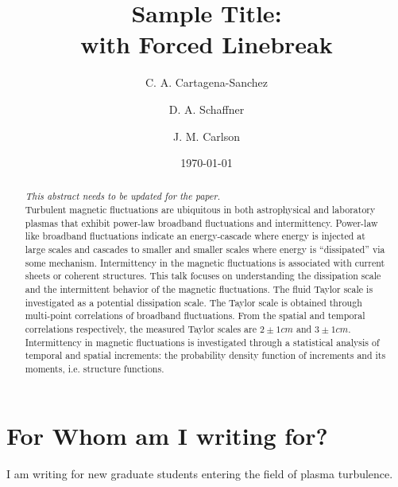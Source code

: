 \documentclass[%
 aip,
 amsmath,amssymb,
preprint,%
]{revtex4-1}
\begin{document}

\title[Sample title]{Sample Title:\\with Forced Linebreak}
\author{C. A. Cartagena-Sanchez}

\author{D. A. Schaffner}%

\author{J. M. Carlson}
\date{\today}%

\begin{abstract}
\textit{This abstract needs to be updated for the paper.}\\
Turbulent magnetic fluctuations are ubiquitous in both astrophysical and laboratory plasmas that exhibit power-law broadband fluctuations and intermittency. Power-law like broadband fluctuations indicate an energy-cascade where energy is injected at large scales and cascades to smaller and smaller scales where energy is ``dissipated'' via some mechanism. Intermittency in the magnetic fluctuations is associated with current sheets or coherent structures. This talk focuses on understanding the dissipation scale and the intermittent behavior of the magnetic fluctuations. The fluid Taylor scale is investigated as a potential dissipation scale. The Taylor scale is obtained through multi-point correlations of broadband fluctuations. From the spatial and temporal correlations respectively, the measured Taylor scales are $2\pm1cm$ and $3\pm1cm$. Intermittency in magnetic fluctuations is investigated through a statistical analysis of temporal and spatial increments: the probability density function of increments and its moments, i.e. structure functions.
\end{abstract}

\maketitle

\section{For Whom am I writing for?}
I am writing for new graduate students entering the field of plasma turbulence.\\
\end{document}
